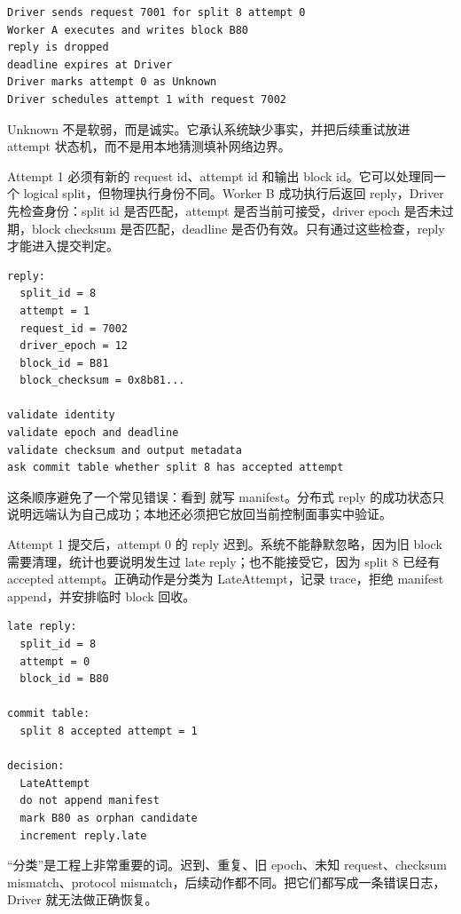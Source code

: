 \begin{lstlisting}[numbers=none,caption={timeout 的状态变化}]
Driver sends request 7001 for split 8 attempt 0
Worker A executes and writes block B80
reply is dropped
deadline expires at Driver
Driver marks attempt 0 as Unknown
Driver schedules attempt 1 with request 7002
\end{lstlisting}

Unknown 不是软弱，而是诚实。它承认系统缺少事实，并把后续重试放进 attempt 状态机，而不是用本地猜测填补网络边界。

Attempt 1 必须有新的 request id、attempt id 和输出 block id。它可以处理同一个 logical split，但物理执行身份不同。Worker B 成功执行后返回 reply，Driver 先检查身份：split id 是否匹配，attempt 是否当前可接受，driver epoch 是否未过期，block checksum 是否匹配，deadline 是否仍有效。只有通过这些检查，reply 才能进入提交判定。

\begin{lstlisting}[numbers=none,caption={reply 验证顺序}]
reply:
  split_id = 8
  attempt = 1
  request_id = 7002
  driver_epoch = 12
  block_id = B81
  block_checksum = 0x8b81...

validate identity
validate epoch and deadline
validate checksum and output metadata
ask commit table whether split 8 has accepted attempt
\end{lstlisting}

这条顺序避免了一个常见错误：看到  就写 manifest。分布式 reply 的成功状态只说明远端认为自己成功；本地还必须把它放回当前控制面事实中验证。

Attempt 1 提交后，attempt 0 的 reply 迟到。系统不能静默忽略，因为旧 block 需要清理，统计也要说明发生过 late reply；也不能接受它，因为 split 8 已经有 accepted attempt。正确动作是分类为 LateAttempt，记录 trace，拒绝 manifest append，并安排临时 block 回收。

\begin{lstlisting}[numbers=none,caption={迟到 reply 的分类}]
late reply:
  split_id = 8
  attempt = 0
  block_id = B80

commit table:
  split 8 accepted attempt = 1

decision:
  LateAttempt
  do not append manifest
  mark B80 as orphan candidate
  increment reply.late
\end{lstlisting}

“分类”是工程上非常重要的词。迟到、重复、旧 epoch、未知 request、checksum mismatch、protocol mismatch，后续动作都不同。把它们都写成一条错误日志，Driver 就无法做正确恢复。

